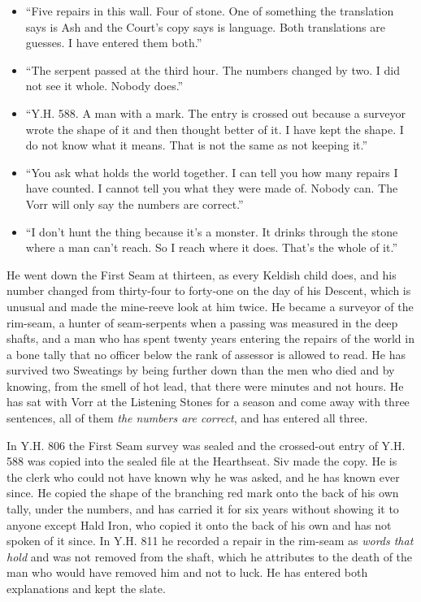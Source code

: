 \documentclass{design/chronicle}
\begin{document}
{\begin{itemize}[leftmargin=1.4em,itemsep=1pt,topsep=3pt,parsep=0pt]
\item “Five repairs in this wall. Four of stone. One of something the translation says is Ash and the Court’s copy says is language. Both translations are guesses. I have entered them both.”

\item “The serpent passed at the third hour. The numbers changed by two. I did not see it whole. Nobody does.”

\item “Y.H. 588. A man with a mark. The entry is crossed out because a surveyor wrote the shape of it and then thought better of it. I have kept the shape. I do not know what it means. That is not the same as not keeping it.”

\item “You ask what holds the world together. I can tell you how many repairs I have counted. I cannot tell you what they were made of. Nobody can. The Vorr will only say the numbers are correct.”

\item “I don’t hunt the thing because it’s a monster. It drinks through the stone where a man can’t reach. So I reach where it does. That’s the whole of it.”

\end{itemize}

He went down the First Seam at thirteen, as every Keldish child does, and his number changed from thirty-four to forty-one on the day of his Descent, which is unusual and made the mine-reeve look at him twice. He became a surveyor of the rim-seam, a hunter of seam-serpents when a passing was measured in the deep shafts, and a man who has spent twenty years entering the repairs of the world in a bone tally that no officer below the rank of assessor is allowed to read. He has survived two Sweatings by being further down than the men who died and by knowing, from the smell of hot lead, that there were minutes and not hours. He has sat with Vorr at the Listening Stones for a season and come away with three sentences, all of them \emph{the numbers are correct}, and has entered all three.

In Y.H. 806 the First Seam survey was sealed and the crossed-out entry of Y.H. 588 was copied into the sealed file at the Hearthseat. Siv made the copy. He is the clerk who could not have known why he was asked, and he has known ever since. He copied the shape of the branching red mark onto the back of his own tally, under the numbers, and has carried it for six years without showing it to anyone except Hald Iron, who copied it onto the back of his own and has not spoken of it since. In Y.H. 811 he recorded a repair in the rim-seam as \emph{words that hold} and was not removed from the shaft, which he attributes to the death of the man who would have removed him and not to luck. He has entered both explanations and kept the slate.

}
\end{document}
